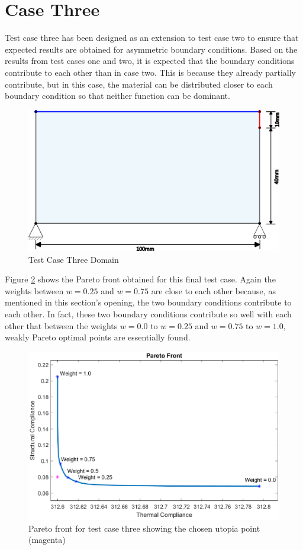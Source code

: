 \section{Case Three}
Test case three has been designed as an extension to test case two to ensure that expected results are obtained for asymmetric boundary conditions. Based on the results from test cases one and two, it is expected that the boundary conditions contribute to each other than in case two. This is because they already partially contribute, but in this case, the material can be distributed closer to each boundary condition so that neither function can be dominant.
\begin{figure}[ht]
    \centering
    \includegraphics[width=0.7\linewidth]{figures/chapter_6/Case3Domain.png}
    \caption{Test Case Three Domain}
    \label{fig:test_case_three_domain}
\end{figure}

Figure \ref{fig:test_case_three_pareto_front} shows the Pareto front obtained for this final test case. Again the weights between $w=0.25$ and $w=0.75$ are close to each other because, as mentioned in this section's opening, the two boundary conditions contribute to each other. In fact, these two boundary conditions contribute so well with each other that between the weights $w=0.0$ to $w=0.25$ and $w=0.75$ to $w=1.0$, weakly Pareto optimal points are essentially found.
\begin{figure}[ht]
    \centering
    \includegraphics[width=0.6\linewidth]{figures/chapter_6/Case3_ParetoFront.eps} 
    \caption{Pareto front for test case three showing the chosen utopia point (magenta)}
    \label{fig:test_case_three_pareto_front}
\end{figure}


